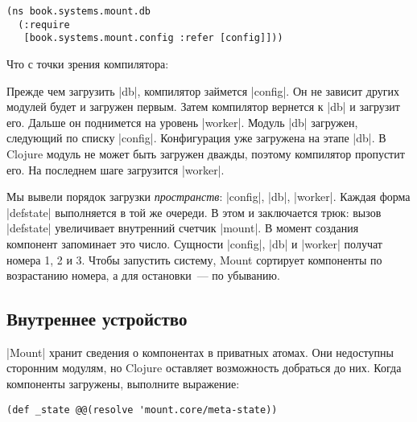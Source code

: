 \begin{verbatim}
(ns book.systems.mount.db
  (:require
   [book.systems.mount.config :refer [config]]))
\end{verbatim}

Что с точки зрения компилятора:

\vspace{1em}


\vspace{1em}

Прежде чем загрузить \spverb|db|, компилятор займется \spverb|config|. Он не
зависит других модулей будет и загружен первым. Затем компилятор вернется к
\spverb|db| и загрузит его. Дальше он поднимется на уровень
\spverb|worker|. Модуль \spverb|db| загружен, следующий по списку
\spverb|config|. Конфигурация уже загружена на этапе \spverb|db|. В Clojure
модуль не может быть загружен дважды, поэтому компилятор пропустит его. На
последнем шаге загрузится \spverb|worker|.

Мы вывели порядок загрузки \emph{пространств}: \spverb|config|, \spverb|db|,
\spverb|worker|. Каждая форма \spverb|defstate| выполняется в той же очереди. В
этом и заключается трюк: вызов \spverb|defstate| увеличивает внутренний счетчик
\spverb|mount|. В момент создания компонент запоминает это число. Сущности
\spverb|config|, \spverb|db| и \spverb|worker| получат номера 1, 2 и 3. Чтобы
запустить систему, Mount сортирует компоненты по возрастанию номера, а для
остановки~--- по убыванию.

\subsection{Внутреннее устройство}

\spverb|Mount| хранит сведения о компонентах в приватных атомах. Они недоступны
сторонним модулям, но Clojure оставляет возможность добраться до них. Когда
компоненты загружены, выполните выражение:

\begin{verbatim}
(def _state @@(resolve 'mount.core/meta-state))
\end{verbatim}

